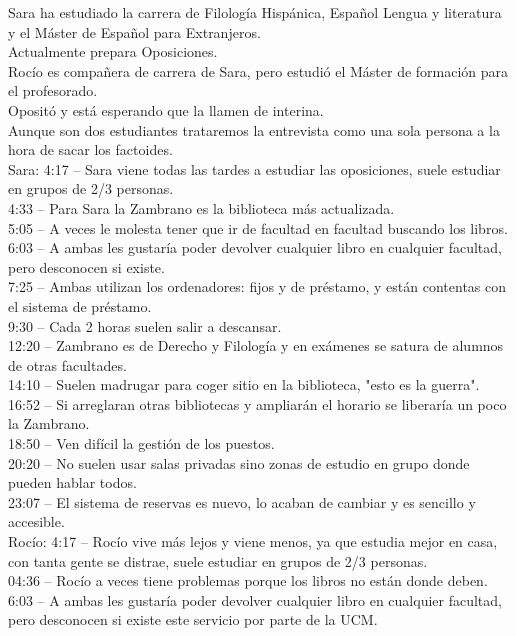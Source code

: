 \documentclass[12pt]{article}
\begin{document}
Sara ha estudiado la carrera de Filología Hispánica, Español Lengua y literatura y el Máster de Español para Extranjeros.\\ Actualmente prepara Oposiciones.\\
Rocío es compañera de carrera de Sara, pero estudió el Máster de formación para el profesorado.\\ Opositó y está esperando que la llamen de interina.\\
Aunque son dos estudiantes trataremos la entrevista como una sola persona a la hora de sacar los factoides.\\ 
Sara: 
4:17 – Sara viene todas las tardes a estudiar las oposiciones, suele estudiar en grupos de 2/3 personas.\\
4:33 – Para Sara la Zambrano es la biblioteca más actualizada.\\
5:05 – A veces le molesta tener que ir de facultad en facultad buscando los libros.\\
6:03 – A ambas les gustaría poder devolver cualquier libro en cualquier facultad, pero desconocen si existe.\\
7:25 – Ambas utilizan los ordenadores: fijos y de préstamo, y están contentas con el sistema de préstamo.\\
9:30 – Cada 2 horas suelen salir a descansar.\\
12:20 – Zambrano es de Derecho y Filología y en exámenes se satura de alumnos de otras facultades.\\
14:10 – Suelen madrugar para coger sitio en la biblioteca, "esto es la guerra".\\
16:52 – Si arreglaran otras bibliotecas y ampliarán el horario se liberaría un poco la Zambrano.\\
18:50 – Ven difícil la gestión de los puestos.\\
20:20 – No suelen usar salas privadas sino zonas de estudio en grupo donde pueden hablar todos.\\
23:07 – El sistema de reservas es nuevo, lo acaban de cambiar y es sencillo y accesible.\\
Rocío:
4:17 – Rocío vive más lejos y viene menos, ya que estudia mejor en casa, con tanta gente se distrae, suele estudiar en grupos de 2/3 personas.\\
04:36 – Rocío a veces tiene problemas porque los libros no están donde deben.\\
6:03 – A ambas les gustaría poder devolver cualquier libro en cualquier facultad, pero desconocen si existe este servicio por parte de la UCM.\\
\end{document}
